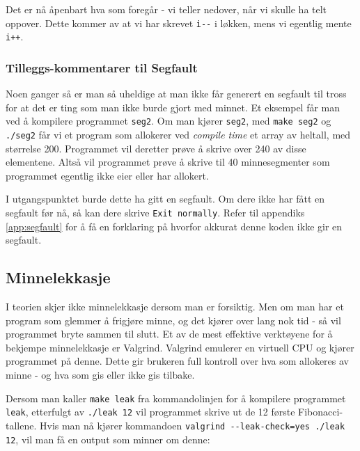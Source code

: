 Det er nå åpenbart hva som foregår - vi teller nedover, når vi skulle ha telt oppover. Dette kommer av at vi har skrevet \verb|i--| i løkken, mens vi egentlig mente \verb|i++|.

\subsubsection{Tilleggs-kommentarer til Segfault}

Noen ganger så er man så uheldige at man ikke får generert en segfault til tross for at det er ting som man ikke burde gjort med minnet. Et eksempel får man ved å kompilere programmet \verb|seg2|. Om man kjører \verb|seg2|, med \verb|make seg2| og \verb|./seg2| får vi et program som allokerer ved \textit{compile time} et array av heltall, med størrelse 200. Programmet vil deretter prøve å skrive over 240 av disse elementene. Altså vil programmet prøve å skrive til 40 minnesegmenter som programmet egentlig ikke eier eller har allokert. 

I utgangspunktet burde dette ha gitt en segfault. Om dere ikke har fått en segfault før nå, så kan dere skrive \verb|Exit normally|. Refer til appendiks \ref{app:segfault} for å få en forklaring på hvorfor akkurat denne koden ikke gir en segfault.

\subsection{Minnelekkasje}

I teorien skjer ikke minnelekkasje dersom man er forsiktig. Men om man har et program som glemmer å frigjøre minne, og det kjører over lang nok tid - så vil programmet bryte sammen til slutt. Et av de mest effektive verktøyene for å bekjempe minnelekkasje er Valgrind. Valgrind emulerer en virtuell CPU og kjører programmet på denne. Dette gir brukeren full kontroll over hva som allokeres av minne - og hva som gis eller ikke gis tilbake.

Dersom man kaller \verb|make leak| fra kommandolinjen for å kompilere programmet \verb|leak|, etterfulgt av \verb|./leak 12| vil programmet skrive ut de 12 første Fibonacci-tallene. Hvis man nå kjører kommandoen \verb|valgrind --leak-check=yes ./leak 12|, vil man få en output som minner om denne:

